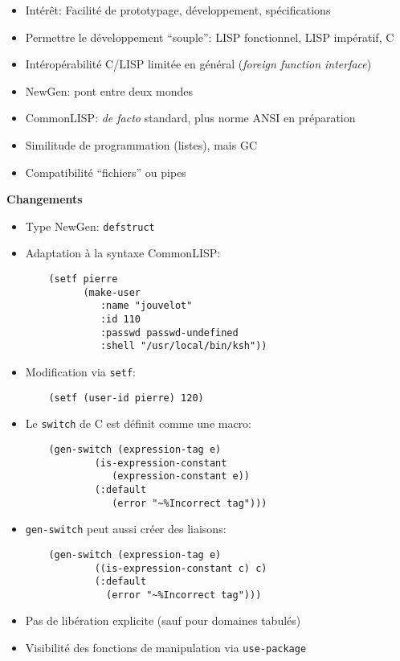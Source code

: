 \documentclass[11pt]{article}
\newcommand{\newgen}{NewGen}
\begin{document}
{\begin{itemize}
\item Intérêt: Facilité de prototypage, développement,
spécifications
\item Permettre le développement ``souple{}'': LISP
fonctionnel, LISP impératif, C
\item Intéropérabilité C/LISP limitée en général ({\em foreign
function interface})
\item \newgen: pont entre deux mondes
\item CommonLISP: {\em de facto} standard, plus norme ANSI en
préparation
\item Similitude de programmation (listes), mais GC
\item Compatibilité ``fichiers'' ou pipes
\end{itemize}

\newpage

\begin{center}
{\huge\bf Changements}
\end{center}

\vskip 2cm

\begin{itemize}
\item Type \newgen: {\tt defstruct}
\item Adaptation à la syntaxe CommonLISP:

\begin{verbatim}
    (setf pierre 
          (make-user 
             :name "jouvelot"
             :id 110
             :passwd passwd-undefined
             :shell "/usr/local/bin/ksh"))
\end{verbatim}
\item Modification via {\tt setf}:

\begin{verbatim}
    (setf (user-id pierre) 120)
\end{verbatim}
\item Le {\tt switch} de C est définit comme une macro:

\begin{verbatim}
    (gen-switch (expression-tag e)
            (is-expression-constant 
               (expression-constant e))
            (:default 
               (error "~%Incorrect tag")))
\end{verbatim}
\item {\tt gen-switch} peut aussi créer des liaisons:

\begin{verbatim}
    (gen-switch (expression-tag e)
            ((is-expression-constant c) c)
            (:default 
              (error "~%Incorrect tag")))
\end{verbatim}
\item Pas de libération explicite (sauf pour domaines tabulés)
\item Visibilité des fonctions de manipulation via {\tt use-package}
\end{itemize}

}
\end{document}
